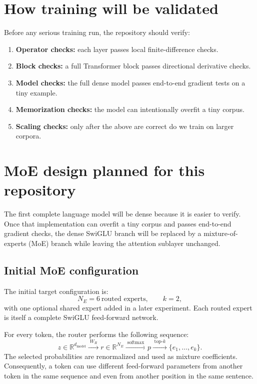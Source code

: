 \documentclass[11pt]{article}
\begin{document}
\section{How training will be validated}

Before any serious training run, the repository should verify:

\begin{enumerate}[leftmargin=1.5em]
    \item \textbf{Operator checks:} each layer passes local finite-difference checks.
    \item \textbf{Block checks:} a full Transformer block passes directional derivative checks.
    \item \textbf{Model checks:} the full dense model passes end-to-end gradient tests on a tiny example.
    \item \textbf{Memorization checks:} the model can intentionally overfit a tiny corpus.
    \item \textbf{Scaling checks:} only after the above are correct do we train on larger corpora.
\end{enumerate}

\section{MoE design planned for this repository}

The first complete language model will be dense because it is easier to verify.
Once that implementation can overfit a tiny corpus and passes end-to-end gradient
checks, the dense SwiGLU branch will be replaced by a mixture-of-experts (MoE)
branch while leaving the attention sublayer unchanged.

\subsection{Initial MoE configuration}
The initial target configuration is:
\[
N_E=6\ \text{routed experts},\qquad k=2,
\]
with one optional shared expert added in a later experiment. Each routed expert is
itself a complete SwiGLU feed-forward network.

For every token, the router performs the following sequence:
\[
z\in\mathbb{R}^{d_{\mathrm{model}}}
\xrightarrow{\;W_R\;}
r\in\mathbb{R}^{N_E}
\xrightarrow{\;\mathrm{softmax}\;}
p
\xrightarrow{\;\mathrm{top}\mbox{-}k\;}
\{e_1,\ldots,e_k\}.
\]
The selected probabilities are renormalized and used as mixture coefficients.
Consequently, a token can use different feed-forward parameters from another token
in the same sequence and even from another position in the same sentence.
\end{document}
